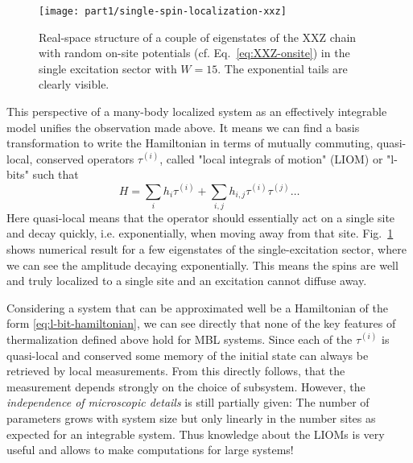 \begin{figure}[htb]
	\centering
	\texttt{[image: part1/single-spin-localization-xxz]}
	\caption{Real-space structure of a couple of eigenstates of the XXZ chain with random on-site potentials (cf. Eq.~\ref{eq:XXZ-onsite}) in the single excitation sector with $W=15$. The exponential tails are clearly visible.}
	\label{fig:xxz-singlespin-exponential-tails}
\end{figure}

This perspective of a many-body localized system as an effectively integrable model unifies the observation made above. It means we can find a basis transformation to write the Hamiltonian in terms of mutually commuting, quasi-local, conserved operators $\tau^{(i)}$, called "local integrals of motion" (LIOM) or "l-bits" such that~\cite{serbynLocalConservationLaws2013,swingleSimpleModelManybody2013,husePhenomenologyFullyManybodylocalized2014}
\begin{equation}\label{eq:l-bit-hamiltonian}
	H = \sum_i h_i \tau^{(i)} + \sum_{i,j} h_{i,j} \tau^{(i)}\tau^{(j)} \ldots
\end{equation}
Here quasi-local means that the operator should essentially act on a single site and decay quickly, i.e. exponentially, when moving away from that site. Fig.~\ref{fig:xxz-singlespin-exponential-tails} shows numerical result for a few eigenstates of the single-excitation sector, where we can see the amplitude decaying exponentially. This means the spins are well and truly localized to a single site and an excitation cannot diffuse away.

Considering a system that can be approximated well be a Hamiltonian of the form \ref{eq:l-bit-hamiltonian}, we can see directly that none of the key features of thermalization defined above hold for MBL systems. Since each of the $\tau^{(i)}$ is quasi-local and conserved some memory of the initial state can always be retrieved by local measurements. From this directly follows, that the measurement depends strongly on the choice of subsystem. However, the \emph{independence of microscopic details} is still partially given: The number of parameters grows with system size but only linearly in the number sites as expected for an integrable system. Thus knowledge about the LIOMs is very useful and allows to make computations for large systems!

